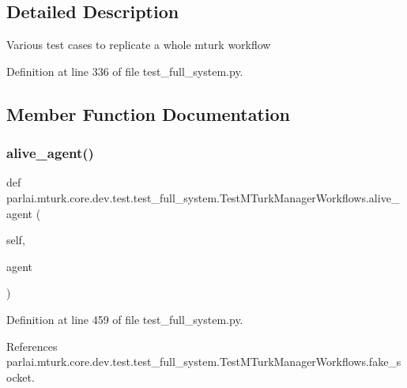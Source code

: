 \subsection{Detailed Description}
\begin{DoxyVerb}Various test cases to replicate a whole mturk workflow\end{DoxyVerb}
 

Definition at line 336 of file test\+\_\+full\+\_\+system.\+py.



\subsection{Member Function Documentation}
\mbox{\label{classparlai_1_1mturk_1_1core_1_1dev_1_1test_1_1test__full__system_1_1TestMTurkManagerWorkflows_a44f3d1dcbacf90d5ed6c8f14c3ac05bf}} 
\subsubsection{\texorpdfstring{alive\+\_\+agent()}{alive\_agent()}}
{\footnotesize\ttfamily def parlai.\+mturk.\+core.\+dev.\+test.\+test\+\_\+full\+\_\+system.\+Test\+M\+Turk\+Manager\+Workflows.\+alive\+\_\+agent (\begin{DoxyParamCaption}\item[{}]{self,  }\item[{}]{agent }\end{DoxyParamCaption})}



Definition at line 459 of file test\+\_\+full\+\_\+system.\+py.



References parlai.\+mturk.\+core.\+dev.\+test.\+test\+\_\+full\+\_\+system.\+Test\+M\+Turk\+Manager\+Workflows.\+fake\+\_\+socket.



